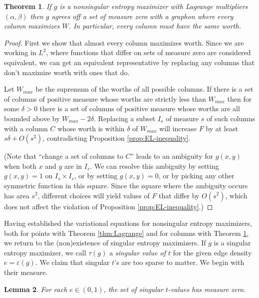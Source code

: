 \documentclass[12pt]{amsart}
\newtheorem{lemma}{Lemma}
\newtheorem{theorem}[lemma]{Theorem}
\newcommand{\tdens}{\tau}
\newcommand{\edens}{\varepsilon}
\newcommand{\Value}{worth}
\newcommand{\Values}{worths}
\begin{document}
{\begin{theorem}  \label{thm:worth} If $g$ is a nonsingular entropy maximizer with Lagrange multipliers 
$(\alpha, \beta)$ then $g$ agrees off a set of measure zero with a graphon where every
column maximizes $W$.  In particular, every column must have
the same \Value. \end{theorem}

\begin{proof} First we show that almost every column maximizes \Value. 
Since we are working in $L^2$, where 
functions that differ on sets of measure zero are considered equivalent, we can get an equivalent representative by
replacing any columns that don't maximize \Value{} with ones that do.

Let $W_{max}$ be the supremum of the {\Values} of all possible columns. 
If there is a set of columns of positive measure whose {\Values} are strictly less than $W_{max}$
then for some $\delta>0$ there is a set of columns of positive measure whose {\Values}  are all bounded above by $W_{max}-2\delta$. 
Replacing a subset $I_s$ of measure $s$ of such columns with a column $C$ whose {\Value} is within 
$\delta$ of $W_{max}$ will increase $F$ by at least 
$s\delta + O(s^2)$, contradicting Proposition \ref{prop:EL-inequality}. 

(Note that ``change a set of columns to $C$'' leads to an ambiguity for $g(x,y)$ when both $x$ and $y$ are in $I_s$. We can resolve this 
ambiguity by setting $g(x,y)=1$ on $I_s \times I_s$, or by setting $g(x,y)=0$, or by picking any other symmetric 
function in this square. Since the square where the ambiguity occurs has area $s^2$, different choices will yield 
values of $F$ that differ by $O(s^2)$, which does not affect the violation of Proposition \ref{prop:EL-inequality}.)
\end{proof}

Having established the variational equations for nonsingular entropy maximizers, both for points with 
Theorem \ref{thm:Lagrange} and for columns with Theorem \ref{thm:worth}, we return to the (non)existence of 
singular entropy maximizers. If $g$ is a singular entropy maximizer, 
we call $\tdens(g)$ a 
{\em singular value of $t$} for the given edge density $e=\edens(g)$.
We claim that singular $t$'s are too sparse to matter. We begin with their measure.  

\begin{lemma}\label{lem:nonsingular}  
For each $e \in (0,1)$, the set of singular $t$-values has measure zero. \end{lemma}

}
\end{document}
